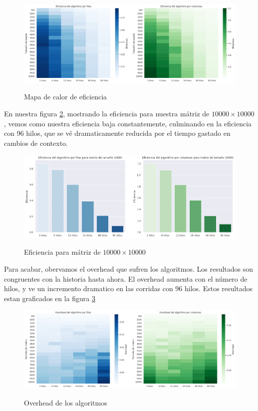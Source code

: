 \documentclass{report}
\begin{document}
\begin{figure}[H]
  \caption{Mapa de calor de eficiencia}
\includegraphics[width=\textwidth]{stars_efficiency}
\label{fig:stareff}
\end{figure}

En nuestra figura \ref{fig:stareffbar}, mostrando la eficiencia para nuestra mátriz
de $10000 \times 10000$, vemos como nuestra eficiencia baja constantemente,
culminando en la eficiencia con 96 hilos, que se vé dramaticamente reducida por el
tiempo gastado en cambios de contexto.

\begin{figure}[H]
  \caption{Eficiencia para mátriz de $10000 \times 10000$}
\includegraphics[width=\textwidth]{stars_efficiency_bar}
\label{fig:stareffbar}
\end{figure}

Para acabar, obervamos el overhead que sufren los algoritmos. Los resultados
son congruentes con la historia hasta ahora. El overhead aumenta con el número de
hilos, y ve un incremento dramatico en las corridas con 96 hilos. Estos resultados
estan graficados en la figura \ref{fig:staroverhead}

\begin{figure}[H]
  \caption{Overhead de los algoritmos}
\includegraphics[width=\textwidth]{stars_overhead}
\label{fig:staroverhead}
\end{figure}
\end{document}
